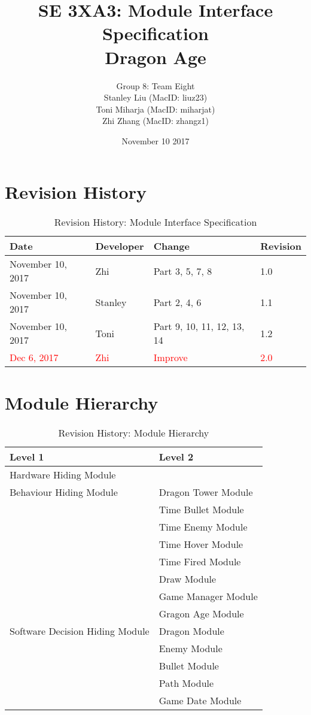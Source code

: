 \documentclass[12,english]{article}
\title{SE 3XA3: Module Interface Specification\\
        Dragon Age}
\author{Group 8: Team Eight \\
                 Stanley Liu (MacID: liuz23) \\    
                 Toni Miharja (MacID: miharjat)\\
                 Zhi Zhang (MacID: zhangz1)}
\date{November 10 2017 }
\begin{document}
\maketitle
\newpage
\tableofcontents
\newpage
 
\section{Revision History}
\begin{table}[h!]
    \centering
    \begin{tabular}{|p{2.5cm}|p{3cm}|p{3cm}|p{2cm}|}
    \hline
    \textbf {Date}  & {Developer} & {Change} & {Revision} \\
    \hline
    November 10, 2017 & Zhi & Part 3, 5, 7, 8 & 1.0\\
    \hline
    November 10, 2017 & Stanley & Part 2, 4, 6 & 1.1\\
    \hline
    November 10, 2017 & Toni & Part 9, 10, 11, 12, 13, 14& 1.2\\
    \hline
    \textcolor{red}{Dec 6, 2017} & \textcolor{red}{Zhi} & \textcolor{red}{Improve} & \textcolor{red}{2.0}\\
    \hline
    \end{tabular}
    \caption{Revision History: Module Interface Specification}
\end{table}
 
\section{Module Hierarchy}
\begin{table}[h!]
    \centering
    \begin{tabular}{|p{5.5cm}|p{5cm}|}
    \hline
    \textbf {Level 1}  & {Level 2} \\
    \hline
    Hardware Hiding Module &  \\
    \hline
    Behaviour Hiding Module & Dragon Tower Module\\
    & Time Bullet Module\\
    &Time Enemy Module\\
    &Time Hover Module\\
    &Time Fired Module\\
    &Draw Module\\
    &Game Manager Module\\
    &Gragon Age Module\\
    \hline
    Software Decision Hiding Module&Dragon Module\\
    & Enemy Module\\
    & Bullet Module\\
    & Path Module\\
    & Game Date Module\\
    \hline
    \end{tabular}
    \caption{Revision History: Module Hierarchy}
\end{table}
\end{document}
